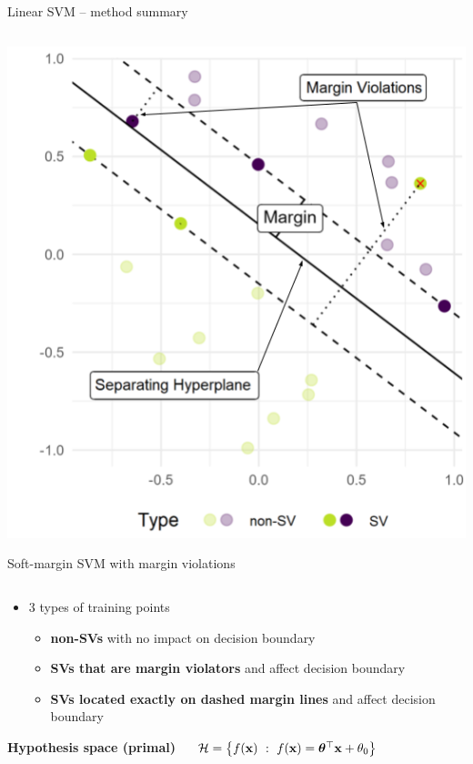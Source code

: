 \documentclass[11pt,compress,t,notes=noshow, xcolor=table]{beamer}
\newcommand{\highlight}[1]{\textcolor{hlcol}{\textbf{#1}}}
\begin{document}
\begin{frame2}{Linear SVM -- method summary}
\begin{columns}[T]
\begin{column}{0.3\linewidth}
  \includegraphics[width=\linewidth]{figure/svm_wording.png} \\
  \begin{center}
  \tiny{Soft-margin SVM with margin violations}
  \end{center}
  \end{column}
\end{columns}

\begin{itemize}
  \item 3 types of training points
\begin{itemize}
  \item \textbf{non-SVs} with no impact on decision boundary
  \item \textbf{SVs that are margin violators} and affect decision boundary
  \item \textbf{SVs located exactly on dashed margin lines} and affect decision boundary
\end{itemize}
\end{itemize}


\medskip

\highlight{Hypothesis space (primal)} ~~ 
$\mathcal{H} = \left\{f(\mathbf{x}) ~:~f(\mathbf{x}) = \bm{\theta}^\top \mathbf{x} + \theta_0 \right\}$\\





\end{frame2}
\end{document}
